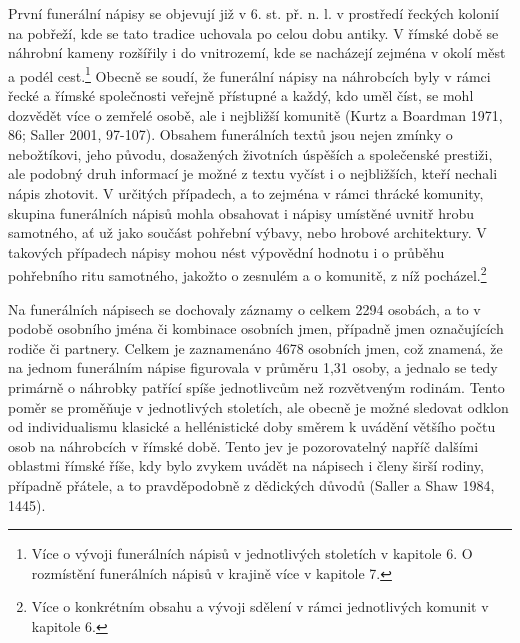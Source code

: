 První funerální nápisy se objevují již v 6. st. př. n. l. v prostředí řeckých kolonií na pobřeží, kde se tato tradice uchovala po celou dobu antiky. V římské době se náhrobní kameny rozšířily i do vnitrozemí, kde se nacházejí zejména v okolí měst a podél cest.\footnote{Více o vývoji funerálních nápisů v jednotlivých stoletích v kapitole 6. O rozmístění funerálních nápisů v krajině více v kapitole 7.} Obecně se soudí, že funerální nápisy na náhrobcích byly v rámci řecké a římské společnosti veřejně přístupné a každý, kdo uměl číst, se mohl dozvědět více o zemřelé osobě, ale i nejbližší komunitě (Kurtz a Boardman 1971, 86; Saller 2001, 97-107). Obsahem funerálních textů jsou nejen zmínky o nebožtíkovi, jeho původu, dosažených životních úspěších a společenské prestiži, ale podobný druh informací je možné z textu vyčíst i o nejbližších, kteří nechali nápis zhotovit. V určitých případech, a to zejména v rámci thrácké komunity, skupina funerálních nápisů mohla obsahovat i nápisy umístěné uvnitř hrobu samotného, ať už jako součást pohřební výbavy, nebo hrobové architektury. V takových případech nápisy mohou nést výpovědní hodnotu i o průběhu pohřebního ritu samotného, jakožto o zesnulém a o komunitě, z níž pocházel.\footnote{Více o konkrétním obsahu a vývoji sdělení v rámci jednotlivých komunit v kapitole 6.}

Na funerálních nápisech se dochovaly záznamy o celkem 2294 osobách, a to v podobě osobního jména či kombinace osobních jmen, případně jmen označujících rodiče či partnery. Celkem je zaznamenáno 4678 osobních jmen, což znamená, že na jednom funerálním nápise figurovala v průměru 1,31 osoby, a jednalo se tedy primárně o náhrobky patřící spíše jednotlivcům než rozvětveným rodinám. Tento poměr se proměňuje v jednotlivých stoletích, ale obecně je možné sledovat odklon od individualismu klasické a hellénistické doby směrem k uvádění většího počtu osob na náhrobcích v římské době. Tento jev je pozorovatelný napříč dalšími oblastmi římské říše, kdy bylo zvykem uvádět na nápisech i členy širší rodiny, případně přátele, a to pravděpodobně z dědických důvodů (Saller a Shaw 1984, 1445).


